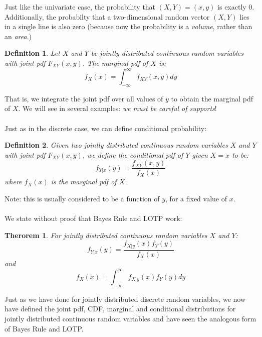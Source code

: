 \documentclass[12pt]{article} %
\newtheorem{defn}{Definition}
\newtheorem{thm}{Therorem}
\begin{document}
Just like the univariate case, the probability that $(X,Y) = (x,y)$ is exactly $0$. Additionally, the probabilty that a two-dimensional random vector $(X,Y)$ lies in a single line is also zero (because now the probability is a \emph{volume}, rather than an \emph{area}.)
\begin{defn}
Let $X$ and $Y$ be jointly distributed continuous random variables with joint pdf $F_{XY}(x,y)$. The marginal pdf of $X$ is:
$$f_X(x) = \int_{-\infty}^\infty f_{XY}(x,y) dy$$ 
\end{defn}
That is, we integrate the joint pdf over all values of $y$ to obtain the marginal pdf of $X$. We will see in several examples: \emph{we must be careful of supports}!\\\\
Just as in the discrete case, we can define conditional probability:
\begin{defn}
Given two jointly distributed continuous random variables $X$ and $Y$ with joint pdf $F_{XY}(x,y)$, we define the conditional pdf of $Y$ given $X=x$ to be:
$$f_{Y|x}(y) = \frac{f_{XY}(x,y)}{f_X(x)}$$
where $f_X(x)$ is the marginal pdf of $X$.
\end{defn}
Note: this is usually considered to be a function of $y$, for a fixed value of $x$.\\\\
We state without proof that Bayes Rule and LOTP work:
\begin{thm}
For jointly distributed continuous random variables $X$ and $Y$:
$$f_{Y|x}(y) = \frac{f_{X|y}(x)f_Y(y)}{f_X(x)}$$
and
$$f_X(x) = \int_{-\infty}^\infty f_{X|y}(x) f_Y(y)dy$$
\end{thm}
Just as we have done for jointly distributed discrete random variables, we now have defined the joint pdf, CDF, marginal and conditional distributions for jointly distributed continuous random variables and have seen the analogous form of Bayes Rule and LOTP.
\end{document}
